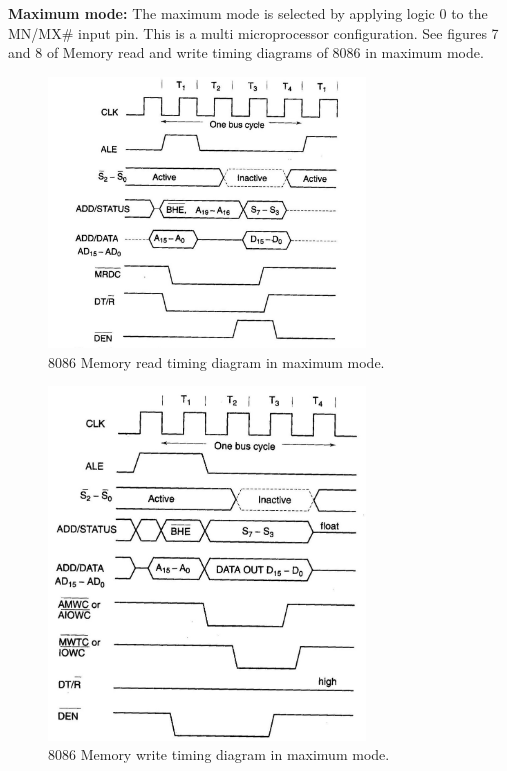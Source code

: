 \documentclass[12pt, a4paper]{scrartcl}
\begin{document}
	\textbf{Maximum mode: }The maximum mode is selected by applying logic 0 to the MN/MX\# input pin. This is a multi microprocessor configuration. See figures 7 and 8 of Memory read and write timing diagrams of 8086 in maximum mode.

	\begin{figure}[h]
		\centering
		\includegraphics[width=0.75\textwidth]{images/8086-max-read.png}
		\caption{8086 Memory read timing diagram in maximum mode.}
		\label{image-7}
	\end{figure}

	\begin{figure}[h]
		\centering
		\includegraphics[width=0.75\textwidth]{images/8086-max-write.png}
		\caption{8086 Memory write timing diagram in maximum mode.}
		\label{image-8}
	\end{figure}
	
\end{document}
